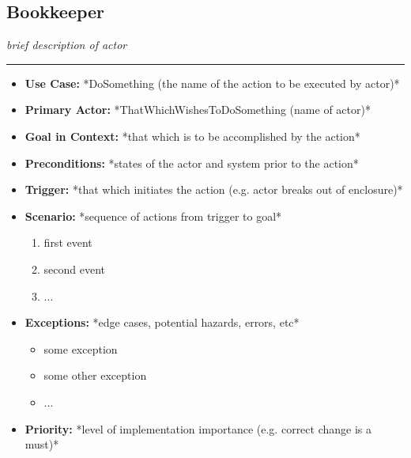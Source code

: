 \documentclass[12pt]{article}
\begin{document}
    \subsection{Bookkeeper}
    \textit{brief description of actor}
    \par\noindent\rule{\textwidth}{0.4pt}    
    \begin{itemize}
        \item[]\textbf{Use Case:}                                
            *DoSomething (the name of the action to be executed by actor)*

        \item[]\textbf{Primary Actor:}
            *ThatWhichWishesToDoSomething (name of actor)*

        \item[]\textbf{Goal in Context:}
            *that which is to be accomplished by the action*

        \item[]\textbf{Preconditions:}
            *states of the actor and system prior to the action*

        \item[]\textbf{Trigger:}
            *that which initiates the action (e.g. actor breaks out of enclosure)*

        \item[]\textbf{Scenario:}
            *sequence of actions from trigger to goal*
            \begin{enumerate}
                \item first event
                \item second event
                \item ...
            \end{enumerate}

        \item[]\textbf{Exceptions:}
            *edge cases, potential hazards, errors, etc*
            \begin{itemize}
                \item[] some exception
                \item[] some other exception                
                \item[] ...
            \end{itemize}

        \item[]\textbf{Priority:}
            *level of implementation importance (e.g. correct change is a must)*


\end{itemize}
\end{document}

